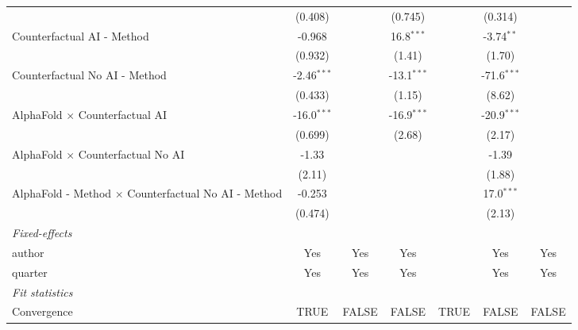 \begin{tabular}{lcccccc}
                                                              & (0.408)       &               & (0.745)       &      & (0.314)       &   \\   
   Counterfactual AI - Method                                 & -0.968        &               & 16.8$^{***}$  &      & -3.74$^{**}$  &   \\   
                                                              & (0.932)       &               & (1.41)        &      & (1.70)        &   \\   
   Counterfactual No AI - Method                              & -2.46$^{***}$ &               & -13.1$^{***}$ &      & -71.6$^{***}$ &   \\   
                                                              & (0.433)       &               & (1.15)        &      & (8.62)        &   \\   
   AlphaFold $\times$ Counterfactual AI                       & -16.0$^{***}$ &               & -16.9$^{***}$ &      & -20.9$^{***}$ &   \\   
                                                              & (0.699)       &               & (2.68)        &      & (2.17)        &   \\   
   AlphaFold $\times$ Counterfactual No AI                    & -1.33         &               &               &      & -1.39         &   \\   
                                                              & (2.11)        &               &               &      & (1.88)        &   \\   
   AlphaFold - Method $\times$ Counterfactual No AI - Method  & -0.253        &               &               &      & 17.0$^{***}$  &   \\   
                                                              & (0.474)       &               &               &      & (2.13)        &   \\   
   \midrule
   \emph{Fixed-effects}\\
   author                                                     & Yes           & Yes           & Yes           &      & Yes           & Yes\\  
   quarter                                                    & Yes           & Yes           & Yes           &      & Yes           & Yes\\  
   \midrule
   \emph{Fit statistics}\\
   Convergence                                                &TRUE           & FALSE         & FALSE         & TRUE & FALSE         & FALSE\\  

\end{tabular}
